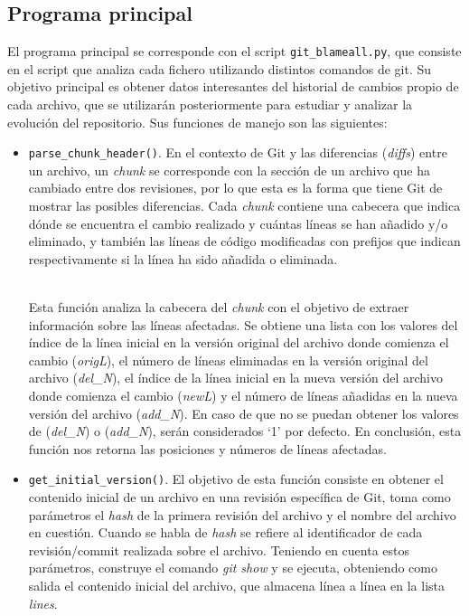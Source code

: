 \documentclass[a4paper, 12pt]{book}
\begin{document}
\subsection{Programa principal}
\label{subsec:programa-principal}

El programa principal se corresponde con el script \texttt{git\_blameall.py}, que consiste en el script que analiza cada fichero utilizando distintos comandos de git. Su objetivo principal es obtener datos interesantes del historial de cambios propio de cada archivo, que se utilizarán posteriormente para estudiar y 
analizar la evolución del repositorio. Sus funciones de manejo son las siguientes:
\begin{itemize}
  \item \texttt{parse\_chunk\_header()}. En el contexto de Git y las diferencias (\textit{diffs}) entre un archivo, un \textit{chunk} se corresponde con la sección de un archivo que ha cambiado entre dos revisiones, por lo que esta es la forma que tiene Git de mostrar las posibles diferencias. Cada \textit{chunk} 
  contiene una cabecera que indica dónde se encuentra el cambio realizado y cuántas líneas se han añadido y/o eliminado, y también las líneas de código modificadas con prefijos que indican respectivamente si la línea ha sido añadida o eliminada.
  
  \\Esta función analiza la cabecera del \textit{chunk} con el objetivo de extraer información sobre las líneas afectadas. Se obtiene una lista con los valores del índice de la línea inicial en la versión original del archivo donde comienza el cambio (\textit{origL}), el número de líneas eliminadas en la versión original
  del archivo (\textit{del\_N}), el índice de la línea inicial en la nueva versión del archivo donde comienza el cambio (\textit{newL}) y el número de líneas añadidas en la nueva versión del archivo (\textit{add\_N}). En caso de que no se puedan obtener los valores de (\textit{del\_N}) o (\textit{add\_N}), serán
  considerados `1' por defecto. En conclusión, esta función nos retorna las posiciones y números de líneas afectadas.
  
  \item \texttt{get\_initial\_version()}. El objetivo de esta función consiste en obtener el contenido inicial de un archivo en una revisión específica de Git, toma como parámetros el \textit{hash} de la primera revisión del archivo y el nombre del archivo en cuestión. Cuando se habla de \textit{hash} se refiere al identificador
  de cada revisión/commit realizada sobre el archivo. Teniendo en cuenta estos parámetros, construye el comando \textit{git show} y se ejecuta, obteniendo como salida el contenido inicial del archivo, que almacena línea a línea en la lista \textit{lines}.


\end{itemize}
\end{document}
